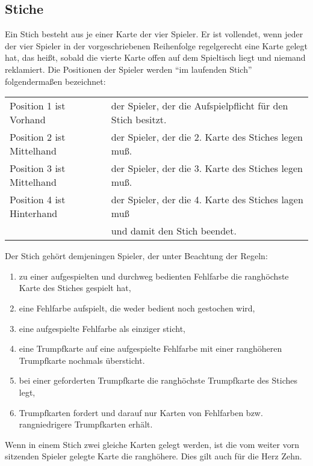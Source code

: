 \documentclass[12pt]{scrartcl}
\begin{document}
\subsection{Stiche}
Ein Stich besteht aus je einer Karte der vier Spieler. Er ist
vollendet, wenn jeder der vier Spieler in der vorgeschriebenen
Reihenfolge regelgerecht eine Karte gelegt hat, das heißt,
sobald die vierte Karte offen auf dem Spieltisch liegt und
niemand reklamiert. Die Positionen der Spieler werden "`im
laufenden Stich"' folgendermaßen bezeichnet:
\begin{center}
  \begin{tabular}{ll}
    Position 1 ist Vorhand & der Spieler, der die Aufspielpflicht für den Stich besitzt.\\
    Position 2 ist Mittelhand & der Spieler, der die 2. Karte des Stiches legen muß.\\
    Position 3 ist Mittelhand & der Spieler, der die 3. Karte des Stiches legen muß.\\
    Position 4 ist Hinterhand & der Spieler, der die 4. Karte des Stiches lagen muß\\
    & und damit den Stich beendet.\\
  \end{tabular}
\end{center}
Der Stich gehört demjeningen Spieler, der unter Beachtung der Regeln:
\begin{enumerate}
  \item zu einer aufgespielten und durchweg bedienten Fehlfarbe die ranghöchste Karte des
    Stiches gespielt hat,
  \item eine Fehlfarbe aufspielt, die weder bedient noch gestochen wird,
  \item eine aufgespielte Fehlfarbe als einziger sticht,
  \item eine Trumpfkarte auf eine aufgespielte Fehlfarbe mit einer ranghöheren Trumpfkarte nochmals übersticht.
  \item bei einer geforderten Trumpfkarte die ranghöchste Trumpfkarte des Stiches legt,
  \item Trumpfkarten fordert und darauf nur Karten von Fehlfarben bzw. rangniedrigere Trumpfkarten erhält.
\end{enumerate}
Wenn in einem Stich zwei gleiche Karten gelegt werden, ist die
vom weiter vorn sitzenden Spieler gelegte Karte die ranghöhere.
Dies gilt auch für die Herz Zehn.
\end{document}
